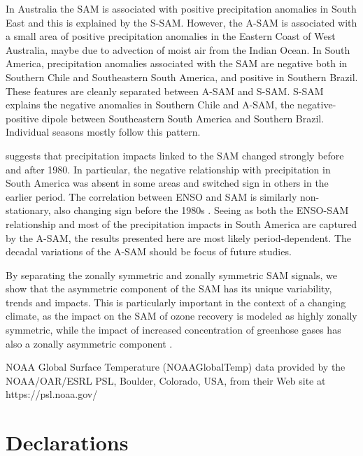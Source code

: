 \documentclass[smallextended]{svjour3}       %
\begin{document}
In Australia the SAM is associated with positive precipitation anomalies in South East and this is explained by the S\nobreakdash-SAM. However, the A\nobreakdash-SAM is associated with a small area of positive precipitation anomalies in the Eastern Coast of West Australia, maybe due to advection of moist air from the Indian Ocean. In South America, precipitation anomalies associated with the SAM are negative both in Southern Chile and Southeastern South America, and positive in Southern Brazil. These features are cleanly separated between A\nobreakdash-SAM and S\nobreakdash-SAM. S\nobreakdash-SAM explains the negative anomalies in Southern Chile and A\nobreakdash-SAM, the negative-positive dipole between Southeastern South America and Southern Brazil. Individual seasons mostly follow this pattern.

\citet{silvestri2009} suggests that precipitation impacts linked to the SAM changed strongly before and after 1980. In particular, the negative relationship with precipitation in South America was absent in some areas and switched sign in others in the earlier period. The correlation between ENSO and SAM is similarly non-stationary, also changing sign before the 1980s \citep{fogt2006, clem2013}. Seeing as both the ENSO\nobreakdash-SAM relationship and most of the precipitation impacts in South America are captured by the A\nobreakdash-SAM, the results presented here are most likely period-dependent. The decadal variations of the A\nobreakdash-SAM should be focus of future studies.

By separating the zonally symmetric and zonally symmetric SAM signals, we show that the asymmetric component of the SAM has its unique variability, trends and impacts. This is particularly important in the context of a changing climate, as the impact on the SAM of ozone recovery is modeled as highly zonally symmetric, while the impact of increased concentration of greenhose gases has also a zonally asymmetric component \citep{arblaster2006}.

\begin{acknowledgements}
NOAA Global Surface Temperature (NOAAGlobalTemp) data provided by the NOAA/OAR/ESRL PSL, Boulder, Colorado, USA, from their Web site at https://psl.noaa.gov/ 
\end{acknowledgements}

\hypertarget{declarations}{%
\section*{Declarations}\label{declarations}}
\end{document}

